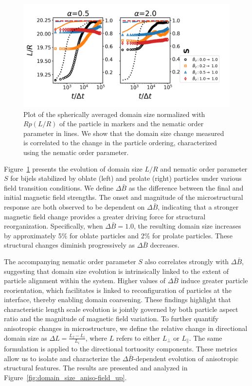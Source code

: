 \begin{figure} 
\centering 
\includegraphics[scale=0.5]{../figures/results/paper2/domain_size-field_up.png} 
\caption{Plot of the spherically averaged domain size normalized with $Rp(L/R)$ of the particle in markers and the nematic order parameter in lines. 
         We show that the domain size change measured is correlated to the change in the particle ordering, characterized using the nematic order parameter.} 
\label{fig:domain_size-field_up} 
\end{figure}

Figure~\ref{fig:domain_size-field_up} presents the evolution of domain size \(L/R\) and nematic order parameter \(S\) for bijels stabilized by oblate (left) 
and prolate (right) particles under various field transition conditions. We define \(\Delta \bar{B}\) as the difference between the final and initial magnetic 
field strengths. The onset and magnitude of the microstructural response are both observed to be dependent on \(\Delta \bar{B}\), indicating that a stronger 
magnetic field change provides a greater driving force for structural reorganization. Specifically, when \(\Delta \bar{B} = 1.0\), the resulting domain size 
increases by approximately 5\% for oblate particles and 2\% for prolate particles. These structural changes diminish progressively as \(\Delta \bar{B}\) decreases.

The accompanying nematic order parameter \(S\) also correlates strongly with \(\Delta \bar{B}\), suggesting that domain size evolution is intrinsically linked 
to the extent of particle alignment within the system. Higher values of \(\Delta \bar{B}\) induce greater particle reorientation, which facilitates is linked to
reconfiguration of particles at the interface, thereby enabling domain coarsening. These findings highlight that characteristic length scale evolution is jointly 
governed by both particle aspect ratio and the magnitude of magnetic field variation. To further quantify anisotropic changes in microstructure, we define the 
relative change in directional domain size as \(\Delta L = \frac{L_f - L_i}{L_i}\), where \(L\) refers to either \(L_{\perp}\) or \(L_{\parallel}\). 
The same formulation is applied to the directional tortuosity components. These metrics allow us to isolate and characterize the \(\Delta \bar{B}\)-dependent 
evolution of anisotropic structural features. The results are presented and analyzed in Figure~\ref{fig:domain_size_aniso-field_up}.

